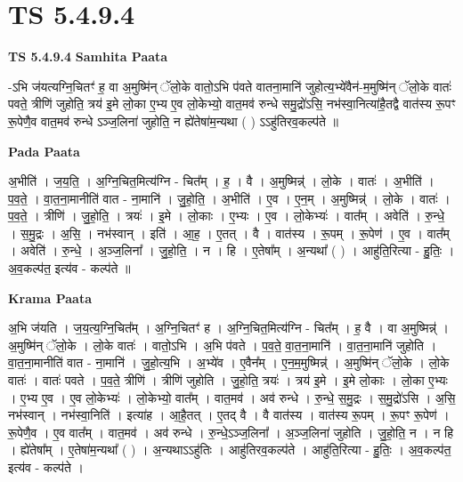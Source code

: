 \documentclass[17pt]{extarticle}
\begin{document}
\section{ TS 5.4.9.4 }

\textbf{TS 5.4.9.4 } \newline
\textbf{Samhita Paata} \newline

-ऽभि ज॑यत्यग्नि॒चितꣳ॑ ह॒ वा अ॒मुष्मि॑न् ॅलो॒के वातो॒ऽभि प॑वते वातना॒मानि॑ जुहोत्य॒भ्ये॑वैन॑-म॒मुष्मि॑न् ॅलो॒के वातः॑ पवते॒ त्रीणि॑ जुहोति॒ त्रय॑ इ॒मे लो॒का ए॒भ्य ए॒व लो॒केभ्यो॒ वात॒मव॑ रुन्धे समु॒द्रो॑ऽसि॒ नभ॑स्वा॒नित्या॑है॒तद्वै वात॑स्य रू॒पꣳ रू॒पेणै॒व वात॒मव॑ रुन्धे ऽञ्ज॒लिना॑ जुहोति॒ न ह्ये॑तेषा॑म॒न्यथा ( ) ऽऽहु॑तिरव॒कल्प॑ते ॥ \newline

\textbf{Pada Paata} \newline

अ॒भीति॑ । ज॒य॒ति॒ । अ॒ग्नि॒चित॒मित्य॑ग्नि - चित᳚म् । ह॒ । वै । अ॒मुष्मिन्न्॑ । लो॒के । वातः॑ । अ॒भीति॑ । प॒व॒ते॒ । वा॒त॒ना॒मानीति॑ वात - ना॒मानि॑ । जु॒हो॒ति॒ । अ॒भीति॑ । ए॒व । ए॒न॒म् । अ॒मुष्मिन्न्॑ । लो॒के । वातः॑ । प॒व॒ते॒ । त्रीणि॑ । जु॒हो॒ति॒ । त्रयः॑ । इ॒मे । लो॒काः । ए॒भ्यः । ए॒व । लो॒केभ्यः॑ । वात᳚म् । अवेति॑ । रु॒न्धे॒ । स॒मु॒द्रः । अ॒सि॒ । नभ॑स्वान् । इति॑ । आ॒ह॒ । ए॒तत् । वै । वात॑स्य । रू॒पम् । रू॒पेण॑ । ए॒व । वात᳚म् । अवेति॑ । रु॒न्धे॒ । अ॒ञ्ज॒लिना᳚ । जु॒हो॒ति॒ । न । हि । ए॒तेषा᳚म् । अ॒न्यथा᳚ ( ) । आहु॑ति॒रित्या - हु॒तिः॒ । अ॒व॒कल्प॑त॒ इत्य॑व - कल्प॑ते ॥  \newline


\textbf{Krama Paata} \newline

अ॒भि ज॑यति । ज॒य॒त्य॒ग्नि॒चित᳚म् । अ॒ग्नि॒चितꣳ॑ ह । अ॒ग्नि॒चित॒मित्य॑ग्नि - चित᳚म् । ह॒ वै । वा अ॒मुष्मिन्न्॑ । अ॒मुष्मि॑न् ॅलो॒के । लो॒के वातः॑ । वातो॒ऽभि । अ॒भि प॑वते । प॒व॒ते॒ वा॒त॒ना॒मानि॑ । वा॒त॒ना॒मानि॑ जुहोति । वा॒त॒ना॒मानीति॑ वात - ना॒मानि॑ । जु॒हो॒त्य॒भि । अ॒भ्ये॑व । ए॒वैन᳚म् । ए॒न॒म॒मुष्मिन्न्॑ । अ॒मुष्मि॑न् ॅलो॒के । लो॒के वातः॑ । वातः॑ पवते । प॒व॒ते॒ त्रीणि॑ । त्रीणि॑ जुहोति । जु॒हो॒ति॒ त्रयः॑ । त्रय॑ इ॒मे । इ॒मे लो॒काः । लो॒का ए॒भ्यः । ए॒भ्य ए॒व । ए॒व लो॒केभ्यः॑ । लो॒केभ्यो॒ वात᳚म् । वात॒मव॑ । अव॑ रुन्धे । रु॒न्धे॒ स॒मु॒द्रः । स॒मु॒द्रो॑ऽसि । अ॒सि॒ नभ॑स्वान् । नभ॑स्वा॒निति॑ । इत्या॑ह । आ॒है॒तत् । ए॒तद् वै । वै वात॑स्य । वात॑स्य रू॒पम् । रू॒पꣳ रू॒पेण॑ । रू॒पेणै॒व । ए॒व वात᳚म् । वात॒मव॑ । अव॑ रुन्धे । रु॒न्धे॒ऽञ्ज॒लिना᳚ । अ॒ञ्ज॒लिना॑ जुहोति । जु॒हो॒ति॒ न । न हि । ह्ये॑तेषा᳚म् । ए॒तेषा॑म॒न्यथा᳚ ( ) । अ॒न्यथाऽऽहु॑तिः । आहु॑तिरव॒कल्प॑ते । आहु॑ति॒रित्या - हु॒तिः॒ । अ॒व॒कल्प॑त॒ इत्य॑व - कल्प॑ते । \newline
\end{document}
